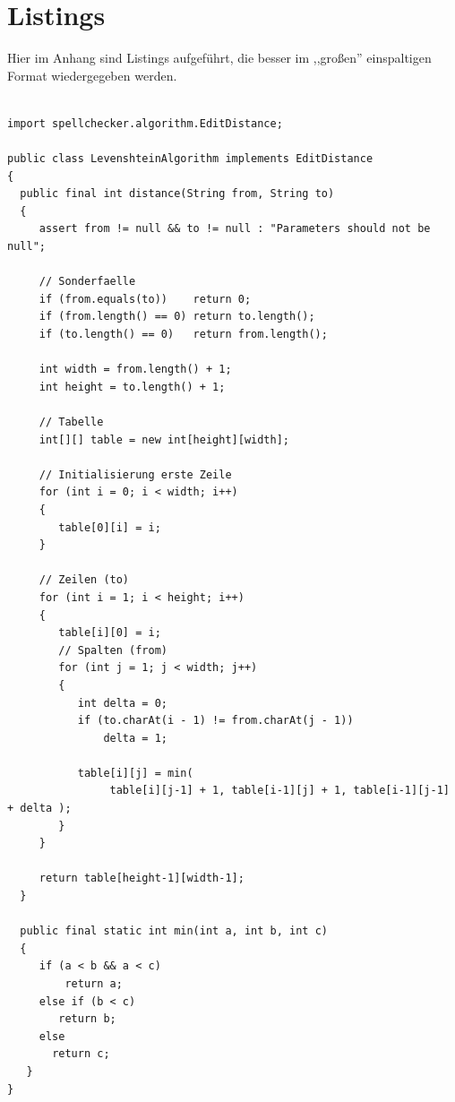 \documentclass[fleqn,10pt,ngerman]{SelfArx}
\begin{document}
\cleardoublepage
\newpage
\onecolumn

\section{Listings}
Hier im Anhang sind Listings aufgeführt, die besser im ,,großen'' einspaltigen Format wiedergegeben werden. 

\begin{lstlisting}[caption=Der Levenshtein Algorithmus, label=Lst:LevenshteinAlgorithm]

import spellchecker.algorithm.EditDistance;

public class LevenshteinAlgorithm implements EditDistance
{
  public final int distance(String from, String to)
  {
     assert from != null && to != null : "Parameters should not be null";

     // Sonderfaelle
     if (from.equals(to))    return 0;
     if (from.length() == 0) return to.length();
     if (to.length() == 0)   return from.length();

     int width = from.length() + 1;
     int height = to.length() + 1;

     // Tabelle
     int[][] table = new int[height][width];

     // Initialisierung erste Zeile
     for (int i = 0; i < width; i++)
     {
        table[0][i] = i;
     }

     // Zeilen (to)
     for (int i = 1; i < height; i++)
     {
        table[i][0] = i;
        // Spalten (from)
        for (int j = 1; j < width; j++)
        {
           int delta = 0;
           if (to.charAt(i - 1) != from.charAt(j - 1))
               delta = 1;

           table[i][j] = min( 
                table[i][j-1] + 1, table[i-1][j] + 1, table[i-1][j-1] + delta );
        }
     }

     return table[height-1][width-1];
  }

  public final static int min(int a, int b, int c)
  {
     if (a < b && a < c)
         return a;
     else if (b < c)
        return b;
     else
       return c;
   }
}
\end{lstlisting}
\end{document}

